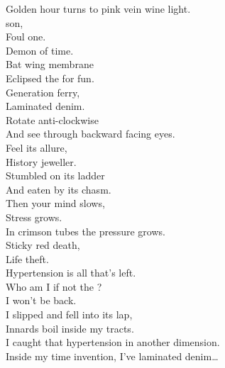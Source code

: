 Golden hour turns to pink vein wine light. \\
 son, \\
Foul one. \\
Demon of time. \\
Bat wing membrane \\
Eclipsed the  for fun. \\

Generation ferry, \\
Laminated denim. \\
Rotate anti-clockwise \\
And see through backward facing eyes. \\
Feel its allure, \\
History jeweller. \\
Stumbled on its ladder \\
And eaten by its chasm. \\
Then your mind slows, \\
Stress grows. \\
In crimson tubes the pressure grows. \\
Sticky red death, \\
Life theft. \\
Hypertension is all that's left. \\

Who am I if not the ? \\
I won't be back. \\
I slipped and fell into its lap, \\
Innards boil inside my tracts. \\

I caught that hypertension in another dimension. \\
Inside my time invention, I've laminated denim… \\
